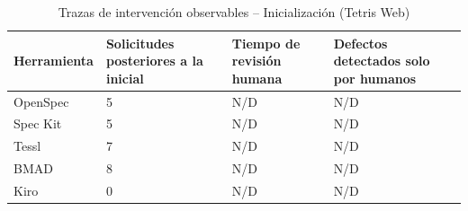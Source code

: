 \begin{table}[H]
\centering
\caption{Trazas de intervención observables -- Inicialización (Tetris Web)}
\label{tab:intervencion_tetris_init}
\begin{tabularx}{\textwidth}{l Y Y Y}
\toprule
\textbf{Herramienta} & \textbf{Solicitudes posteriores a la inicial} & \textbf{Tiempo de revisión humana} & \textbf{Defectos detectados solo por humanos} \\
\midrule
OpenSpec & 5 & N/D & N/D \\
Spec Kit & 5 & N/D & N/D \\
Tessl & 7 & N/D & N/D \\
BMAD & 8 & N/D & N/D \\
Kiro & 0 & N/D & N/D \\
\bottomrule
\end{tabularx}
\end{table}

